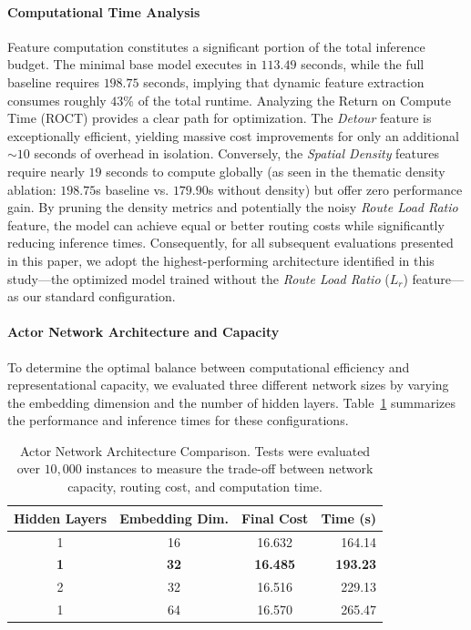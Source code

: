 \documentclass[letterpaper]{article} %
\begin{document}
\paragraph{Computational Time Analysis}
Feature computation constitutes a significant portion of the total inference budget. The minimal base model executes in $113.49$ seconds, while the full baseline requires $198.75$ seconds, implying that dynamic feature extraction consumes roughly $43\%$ of the total runtime. 
Analyzing the Return on Compute Time (ROCT) provides a clear path for optimization. The \textit{Detour} feature is exceptionally efficient, yielding massive cost improvements for only an additional $\sim 10$ seconds of overhead in isolation. Conversely, the \textit{Spatial Density} features require nearly $19$ seconds to compute globally (as seen in the thematic density ablation: $198.75$s baseline vs. $179.90$s without density) but offer zero performance gain. By pruning the density metrics and potentially the noisy \textit{Route Load Ratio} feature, the model can achieve equal or better routing costs while significantly reducing inference times. Consequently, for all subsequent evaluations presented in this paper, we adopt the highest-performing architecture identified in this study—the optimized model trained without the \textit{Route Load Ratio} ($L_r$) feature—as our standard configuration.

\paragraph{Actor Network Architecture and Capacity}

To determine the optimal balance between computational efficiency and representational capacity, we evaluated three different network sizes by varying the embedding dimension and the number of hidden layers. Table~\ref{tab:architecture_comp} summarizes the performance and inference times for these configurations.

\begin{table}[t]
\centering
\small
\caption{Actor Network Architecture Comparison. Tests were evaluated over $10{,}000$ instances to measure the trade-off between network capacity, routing cost, and computation time.}
\label{tab:architecture_comp}
\begin{tabular}{c c c r}
\toprule
\textbf{Hidden Layers} & \textbf{Embedding Dim.} & \textbf{Final Cost} & \textbf{Time (s)} \\
\midrule
1 & 16 & 16.632 & 164.14 \\
\textbf{1} & \textbf{32} & \textbf{16.485} & \textbf{193.23} \\
2 & 32 & 16.516 & 229.13 \\
1 & 64 & 16.570 & 265.47 \\
\bottomrule
\end{tabular}
\end{table}
\end{document}
